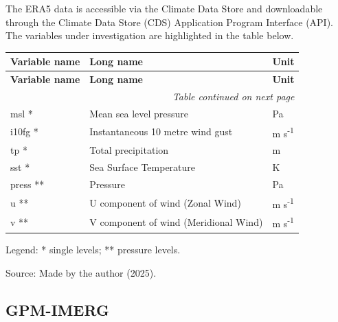 The ERA5 data is accessible via the Climate Data Store and downloadable through the Climate Data Store (CDS) Application Program Interface (API). The variables under investigation are highlighted in the table below.



\begin{center}
	 \label{tab:era5_variables}
\end{center}

\begin{longtable}{p{3cm} p{8cm} p{2.5cm}}
	\toprule
	\textbf{Variable name} & \textbf{Long name} & \textbf{Unit} \\
	\midrule
	\endfirsthead
	
	\toprule
	\textbf{Variable name} & \textbf{Long name} & \textbf{Unit} \\
	\midrule
	\endhead
	
	\multicolumn{3}{r}{\textit{Table continued on next page}} \\
	\endfoot
	
	\bottomrule
	\endlastfoot
	
	msl *     & Mean sea level pressure                         & Pa \\
	i10fg *   & Instantaneous 10 metre wind gust                & m s\textsuperscript{-1} \\
	tp *      & Total precipitation                             & m \\
	sst *     & Sea Surface Temperature                          & K \\
	press **  & Pressure                                         & Pa \\
	u **      & U component of wind (Zonal Wind)                 & m s\textsuperscript{-1} \\
	v **      & V component of wind (Meridional Wind)            & m s\textsuperscript{-1} \\
\end{longtable}

\vspace{-1em}
\noindent\small Legend: * single levels; ** pressure levels.

\vspace{1em}
\begin{center}
	Source: Made by the author (2025).
\end{center}

\subsection{GPM-IMERG}

